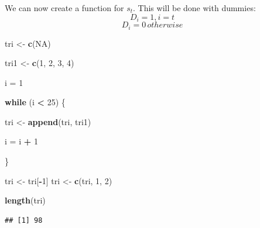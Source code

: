\documentclass[
]{article}
\newenvironment{Shaded}{\begin{snugshade}}{\end{snugshade}}
\newcommand{\ControlFlowTok}[1]{\textcolor[rgb]{0.13,0.29,0.53}{\textbf{#1}}}
\newcommand{\DecValTok}[1]{\textcolor[rgb]{0.00,0.00,0.81}{#1}}
\newcommand{\KeywordTok}[1]{\textcolor[rgb]{0.13,0.29,0.53}{\textbf{#1}}}
\newcommand{\NormalTok}[1]{#1}
\newcommand{\OperatorTok}[1]{\textcolor[rgb]{0.81,0.36,0.00}{\textbf{#1}}}
\newcommand{\OtherTok}[1]{\textcolor[rgb]{0.56,0.35,0.01}{#1}}
\newcommand{\StringTok}[1]{\textcolor[rgb]{0.31,0.60,0.02}{#1}}
\begin{document}
We can now create a function for \(s_t\). This will be done with
dummies: \[ D_i = 1, i = t \] \[ D_i = 0 \, otherwise\]

\begin{Shaded}
\begin{Highlighting}[]
\NormalTok{tri <-}\StringTok{ }\KeywordTok{c}\NormalTok{(}\OtherTok{NA}\NormalTok{)}

\NormalTok{tri1 <-}\StringTok{ }\KeywordTok{c}\NormalTok{(}\DecValTok{1}\NormalTok{, }\DecValTok{2}\NormalTok{, }\DecValTok{3}\NormalTok{, }\DecValTok{4}\NormalTok{)}

\NormalTok{i =}\StringTok{ }\DecValTok{1}

\ControlFlowTok{while}\NormalTok{ (i }\OperatorTok{<}\StringTok{ }\DecValTok{25}\NormalTok{) \{}
    
\NormalTok{    tri <-}\StringTok{ }\KeywordTok{append}\NormalTok{(tri, tri1)}
    
\NormalTok{    i =}\StringTok{ }\NormalTok{i }\OperatorTok{+}\StringTok{ }\DecValTok{1}
    
\NormalTok{\}}

\NormalTok{tri <-}\StringTok{ }\NormalTok{tri[}\OperatorTok{-}\DecValTok{1}\NormalTok{]}
\NormalTok{tri <-}\StringTok{ }\KeywordTok{c}\NormalTok{(tri, }\DecValTok{1}\NormalTok{, }\DecValTok{2}\NormalTok{)}

\KeywordTok{length}\NormalTok{(tri)}
\end{Highlighting}
\end{Shaded}

\begin{verbatim}
## [1] 98
\end{verbatim}
\end{document}
